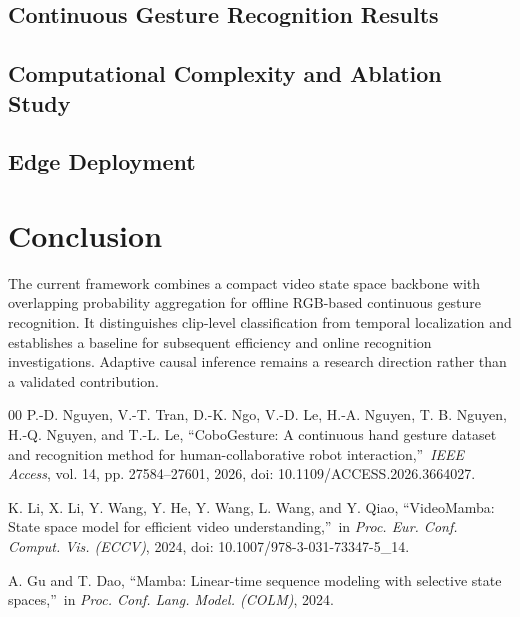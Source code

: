 \documentclass{ieeeaccess}
\begin{document}
\subsection{Continuous Gesture Recognition Results}
\subsection{Computational Complexity and Ablation Study}
\subsection{Edge Deployment}

\section{Conclusion}
\label{sec:conclusion}
The current framework combines a compact video state space backbone with overlapping probability aggregation for offline RGB-based continuous gesture recognition. It distinguishes clip-level classification from temporal localization and establishes a baseline for subsequent efficiency and online recognition investigations. Adaptive causal inference remains a research direction rather than a validated contribution.

\begin{thebibliography}{00}
P.-D. Nguyen, V.-T. Tran, D.-K. Ngo, V.-D. Le, H.-A. Nguyen,
T. B. Nguyen, H.-Q. Nguyen, and T.-L. Le,
\textquotedblleft CoboGesture: A continuous hand gesture dataset and recognition method
for human-collaborative robot interaction,\textquotedblright\
\emph{IEEE Access}, vol. 14, pp. 27584--27601, 2026,
doi: 10.1109/ACCESS.2026.3664027.

K. Li, X. Li, Y. Wang, Y. He, Y. Wang, L. Wang, and Y. Qiao,
\textquotedblleft VideoMamba: State space model for efficient video understanding,\textquotedblright\
in \emph{Proc. Eur. Conf. Comput. Vis. (ECCV)}, 2024,
doi: 10.1007/978-3-031-73347-5\_14.

A. Gu and T. Dao,
\textquotedblleft Mamba: Linear-time sequence modeling with selective state spaces,\textquotedblright\
in \emph{Proc. Conf. Lang. Model. (COLM)}, 2024.
\end{thebibliography}

\EOD
\end{document}

